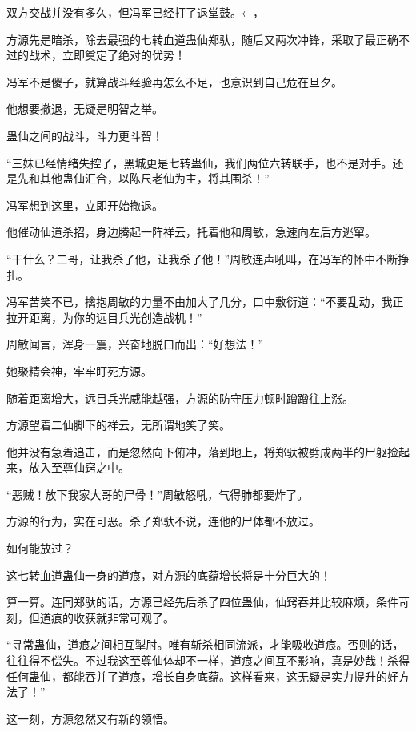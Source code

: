
\begin{this_body}

双方交战并没有多久，但冯军已经打了退堂鼓。←，

方源先是暗杀，除去最强的七转血道蛊仙郑驮，随后又两次冲锋，采取了最正确不过的战术，立即奠定了绝对的优势！

冯军不是傻子，就算战斗经验再怎么不足，也意识到自己危在旦夕。

他想要撤退，无疑是明智之举。

蛊仙之间的战斗，斗力更斗智！

“三妹已经情绪失控了，黑城更是七转蛊仙，我们两位六转联手，也不是对手。还是先和其他蛊仙汇合，以陈尺老仙为主，将其围杀！”

冯军想到这里，立即开始撤退。

他催动仙道杀招，身边腾起一阵祥云，托着他和周敏，急速向左后方逃窜。

“干什么？二哥，让我杀了他，让我杀了他！”周敏连声吼叫，在冯军的怀中不断挣扎。

冯军苦笑不已，擒抱周敏的力量不由加大了几分，口中敷衍道：“不要乱动，我正拉开距离，为你的远目兵光创造战机！”

周敏闻言，浑身一震，兴奋地脱口而出：“好想法！”

她聚精会神，牢牢盯死方源。

随着距离增大，远目兵光威能越强，方源的防守压力顿时蹭蹭往上涨。

方源望着二仙脚下的祥云，无所谓地笑了笑。

他并没有急着追击，而是忽然向下俯冲，落到地上，将郑驮被劈成两半的尸躯捡起来，放入至尊仙窍之中。

“恶贼！放下我家大哥的尸骨！”周敏怒吼，气得肺都要炸了。

方源的行为，实在可恶。杀了郑驮不说，连他的尸体都不放过。

如何能放过？

这七转血道蛊仙一身的道痕，对方源的底蕴增长将是十分巨大的！

算一算。连同郑驮的话，方源已经先后杀了四位蛊仙，仙窍吞并比较麻烦，条件苛刻，但道痕的收获就非常可观了。

“寻常蛊仙，道痕之间相互掣肘。唯有斩杀相同流派，才能吸收道痕。否则的话，往往得不偿失。不过我这至尊仙体却不一样，道痕之间互不影响，真是妙哉！杀得任何蛊仙，都能吞并了道痕，增长自身底蕴。这样看来，这无疑是实力提升的好方法了！”

这一刻，方源忽然又有新的领悟。


\end{this_body}
